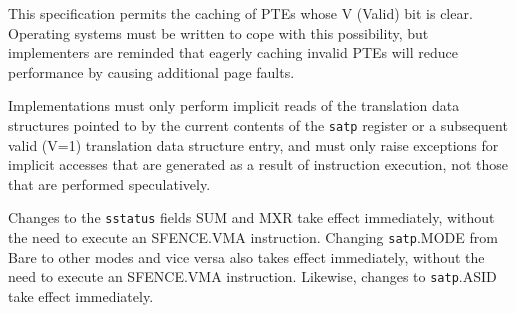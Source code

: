\begin{commentary}
This specification permits the caching of PTEs whose V (Valid) bit is clear.
Operating systems must be written to cope with this possibility, but implementers
are reminded that eagerly caching invalid PTEs will reduce performance by causing
additional page faults.
\end{commentary}

Implementations must only perform implicit reads of the translation
data structures pointed to by the current contents of the {\tt satp}
register or a subsequent valid (V=1) translation data structure entry,
and must only raise exceptions for implicit accesses that are
generated as a result of instruction execution, not those that are
performed speculatively.

Changes to the {\tt sstatus} fields SUM and MXR take effect immediately,
without the need to execute an SFENCE.VMA instruction.
Changing {\tt satp}.MODE from Bare to other modes and vice versa also
takes effect immediately, without the need to execute an SFENCE.VMA
instruction.
Likewise, changes to {\tt satp}.ASID take effect immediately.

